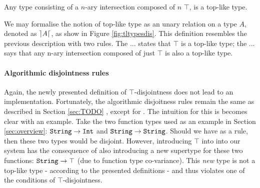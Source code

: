 \begin{definition}
  Any type consisting of a $n$-ary intersection composed of $n$ $\top$, is a top-like type. 
\end{definition}

We may formalise the notion of top-like type as an unary relation on a type $A$, denoted as $\rceil A \lceil$, as show in 
Figure \ref{fig:tltypesdis}.
This definition resembles the previous description with two rules.
The ... states that $\top$ is a top-like type; the ... says that any n-ary intersection composed of just $\top$ is also a
top-like type.








\paragraph{Algorithmic disjointness rules}

Again, the newly presented definition of $\top$-disjointness does not lead to an implementation. 
Fortunately, the algorithmic disjoitness rules remain the same as described in Section \ref{sec:TODO} 
, except for .
The intuition for this is becomes clear with an example.
Take the two function types used as an example in Section \ref{sec:overview}: 
$\texttt{String} \to \texttt{Int}$ and $\texttt{String} \to \texttt{String}$. 
Should we have  as a rule, then these two types would be disjoint. 
However, introducing $\top$ into into our system has the consequence of also introducing a new supertype for these 
two functions: $\texttt{String} \to \top$ (due to function type co-variance). 
This \emph{new} type is not a top-like type - according to the presented definitions - and thus violates one of the
conditions of $\top$-disjointness.

